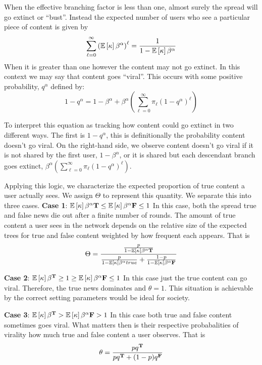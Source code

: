 When the effective branching factor is less than one, almost surely the spread will go extinct or ``bust''. Instead the expected number of users who see a particular piece of content is given by 
\begin{equation}
    \sum_{\ell=0}^\infty  {\left(\mathbb{E}\left[ \kappa \right]  \beta^{\alpha} \right)}^\ell = \frac{1}{1-\mathbb{E}\left[ \kappa \right] \beta^{\alpha} }
\end{equation}
When it is greater than one however the content may not go extinct. In this context we may say that content goes ``viral''. This occurs with some positive probability, $q^\alpha$ defined by: 
\begin{equation*}
    1-q^\alpha = 1 -\beta^\alpha + \beta^\alpha \left( \sum_{\ell=0}^\infty \pi_\ell {\left(1-q^\alpha\right)}^\ell \right)
\end{equation*}

To interpret this equation as tracking how content could go extinct in two different ways. The first is $1-q^\alpha$, this is definitionally the probability content doesn't go viral. On the right-hand side, we observe content doesn't go viral if it is not shared by the first user, $1-\beta^\alpha$, or it is shared but each descendant branch goes extinct, $\beta^\alpha \left( \sum_{\ell=0}^\infty \pi_\ell {\left(1-q^\alpha\right)}^\ell \right)$.

Applying this logic, we characterize the expected proportion of true content a user actually sees. We assign $\Theta$ to represent this quantity. We separate this into three cases. 
\textbf{Case 1}: $\mathbb{E}\left[ \kappa \right] \beta^{\alpha}{\mathbf{T}} \leq \mathbb{E}\left[ \kappa \right] \beta^{\alpha}{\mathbf{F}} \leq 1 $ 
In this case, both the spread true and false news die out after a finite number of rounds. The amount of true content a user sees in the network depends on the relative size of the expected trees for true and false content weighted by how frequent each appears. That is 
\[ \Theta = \frac{ \frac{p}{ 1 - \mathbb{E}\left[ \kappa \right] \beta^{\alpha}{\mathbf{T}}}}{ \frac{p}{1-\mathbb{E}\left[ \kappa \right] \beta^{\alpha}{true}} + \frac{1-p}{1-\mathbb{E}\left[ \kappa \right] \beta^{\alpha}{\mathbf{F}}}} \]


\textbf{Case 2}:  $\mathbb{E}\left[ \kappa \right] \beta^{\mathbf{T}} \geq  1 \geq \mathbb{E}\left[ \kappa \right] \beta^{\alpha}{\mathbf{F}} \leq 1 $ 
In this case just the true content can go viral. Therefore, the true news dominates and $\theta=1$. This situation is achievable by the correct setting parameters would be ideal for society. 

\textbf{Case 3}:  $\mathbb{E}\left[ \kappa \right] \beta^{\mathbf{T}} >\mathbb{E}\left[ \kappa \right] \beta^{\alpha}{\mathbf{F}} >  1 $ 
In this case both true and false content sometimes goes viral. What matters then is their respective probabalities of virality how much true and false content a user observes. That is 
\begin{equation}
    \theta = \frac{pq^{\mathbf{T}}}{pq^{\mathbf{T}} + (1-p)q^{\mathbf{F}} } 
\end{equation}


